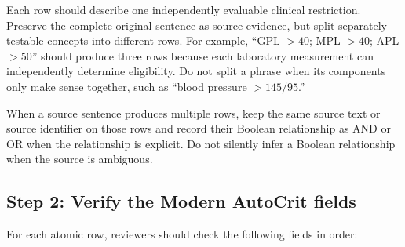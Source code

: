 \documentclass[11pt]{article}
\begin{document}
Each row should describe one independently evaluable clinical restriction. Preserve the complete original sentence as source evidence, but split separately testable concepts into different rows. For example, ``GPL $>40$; MPL $>40$; APL $>50$'' should produce three rows because each laboratory measurement can independently determine eligibility. Do not split a phrase when its components only make sense together, such as ``blood pressure $>145/95$.''

When a source sentence produces multiple rows, keep the same source text or source identifier on those rows and record their Boolean relationship as AND or OR when the relationship is explicit. Do not silently infer a Boolean relationship when the source is ambiguous.

\subsection{Step 2: Verify the Modern AutoCrit fields}

For each atomic row, reviewers should check the following fields in order:
\end{document}
